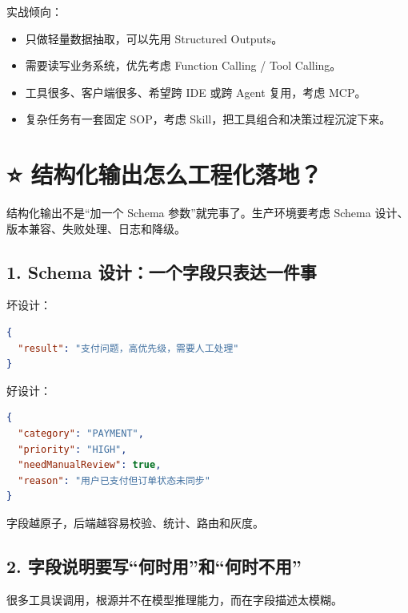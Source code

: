 \documentclass[10pt,a4paper]{ctexart}
\begin{document}
实战倾向：


\begin{itemize}[itemsep=2pt, topsep=4pt]
  \item 只做轻量数据抽取，可以先用 Structured Outputs。
  \item 需要读写业务系统，优先考虑 Function Calling / Tool Calling。
  \item 工具很多、客户端很多、希望跨 IDE 或跨 Agent 复用，考虑 MCP。
  \item 复杂任务有一套固定 SOP，考虑 Skill，把工具组合和决策过程沉淀下来。
\end{itemize}


\section{⭐️ 结构化输出怎么工程化落地？}


结构化输出不是“加一个 Schema 参数”就完事了。生产环境要考虑 Schema 设计、版本兼容、失败处理、日志和降级。



\subsection{1. Schema 设计：一个字段只表达一件事}


坏设计：



\begin{lstlisting}[language=json]
{
  "result": "支付问题，高优先级，需要人工处理"
}
\end{lstlisting}



好设计：



\begin{lstlisting}[language=json]
{
  "category": "PAYMENT",
  "priority": "HIGH",
  "needManualReview": true,
  "reason": "用户已支付但订单状态未同步"
}
\end{lstlisting}



字段越原子，后端越容易校验、统计、路由和灰度。



\subsection{2. 字段说明要写“何时用”和“何时不用”}


很多工具误调用，根源并不在模型推理能力，而在字段描述太模糊。
\end{document}
